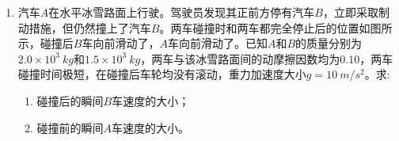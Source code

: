\begin{enumerate}[leftmargin=0em]


\newpage
\item 
{}
汽车$ A $在水平冰雪路面上行驶。驾驶员发现其正前方停有汽车$ B $，立即采取制动措施，但仍然撞上了汽车$ B $。两车碰撞时和两车都完全停止后的位置如图所示，碰撞后$ B $车向前滑动了，$ A $车向前滑动了。已知$ A $和$ B $的质量分别为$ 2.0 \times 10^{3}\ kg $和$ 1.5 \times 10^{3}\ kg $，两车与该冰雪路面间的动摩擦因数均为$ 0.10 $，两车碰撞时间极短，在碰撞后车轮均没有滚动，重力加速度大小$ g=10\ m/s^{2} $。求:
\begin{enumerate}
\renewcommand{\labelenumi}{\arabic{enumi}.}
\item
碰撞后的瞬间$ B $车速度的大小；
\item 
碰撞前的瞬间$ A $车速度的大小。


\end{enumerate}
\begin{figure}[h!]
\flushright

\end{figure}











\end{enumerate}







